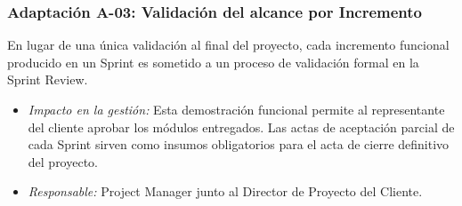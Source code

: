 \subsubsection{Adaptación A-03: Validación del alcance por Incremento}
En lugar de una única validación al final del proyecto, cada incremento funcional producido en un Sprint es sometido a un proceso de validación formal en la Sprint Review.
\begin{itemize}
    \item \textit{Impacto en la gestión:} Esta demostración funcional permite al representante del cliente aprobar los módulos entregados. Las actas de aceptación parcial de cada Sprint sirven como insumos obligatorios para el acta de cierre definitivo del proyecto.
    \item \textit{Responsable:} Project Manager junto al Director de Proyecto del Cliente.
\end{itemize}


